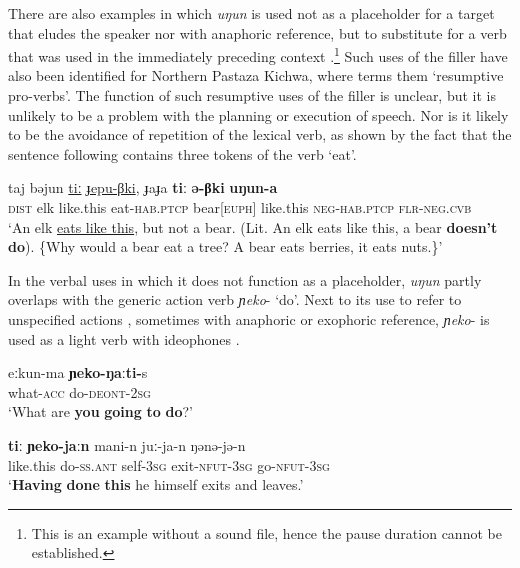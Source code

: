 \documentclass[output=paper]{langscibook}
\begin{document}
There are also examples in which \textit{uŋun} is used not as a placeholder for a target that eludes the speaker nor with anaphoric reference, but to substitute for a verb that was used in the immediately preceding context .\footnote{This is an example without a sound file, hence the pause duration cannot be established.} Such uses of the filler have also been identified for Northern Pastaza Kichwa, where \cite{chapters/rice} terms them ‘resumptive pro-verbs’. The function of such resumptive uses of the filler is unclear, but it is unlikely to be a problem with the planning or execution of speech. Nor is it likely to be the avoidance of repetition of the lexical verb, as shown by the fact that the sentence following  contains three tokens of the verb ‘eat’.

\ea \label{ex:pakendorf:37}
\gll taj bəjun \uline{tiː} \uline{ɟepu-βki}, ɟaɟa \textbf{tiː} \textbf{ə-βki} \textbf{uŋun-a}\\
\textsc{dist} elk like.this eat-\textsc{hab.ptcp} bear[\textsc{euph}] like.this \textsc{neg}-\textsc{hab.ptcp} \textsc{flr-neg.cvb}\\
\glt ‘An elk \uline{eats like this}, but not a bear. (Lit. An elk eats like this, a bear \textbf{doesn’t} \textbf{do}). \{Why would a bear eat a tree? A bear eats berries, it eats nuts.\}’ 
\z

In the verbal uses in which it does not function as a placeholder, \textit{uŋun} partly overlaps with the generic action verb \textit{ɲeko}{}- ‘do’. Next to its use to refer to unspecified actions , sometimes with anaphoric  or exophoric reference, \textit{ɲeko}{}- is used as a light verb with ideophones . 


\ea \label{ex:pakendorf:38}
\gll eːkun-ma \textbf{ɲeko-ŋaːti-}s\\
what-\textsc{acc} do-\textsc{deont-2sg}\\
\glt ‘What are \textbf{you} \textbf{going} \textbf{to} \textbf{do}?’ 
\z


\ea \label{ex:pakendorf:39}
\gll \textbf{tiː} \textbf{ɲeko-jaːn} mani-n juː-ja-n ŋənə-jə-n\\
like.this do-\textsc{ss.ant} self-\textsc{3sg} exit-\textsc{nfut-3sg} go-\textsc{nfut-3sg}\\
\glt ‘\textbf{Having} \textbf{done} \textbf{this} he himself exits and leaves.’ 
\z
\end{document}
